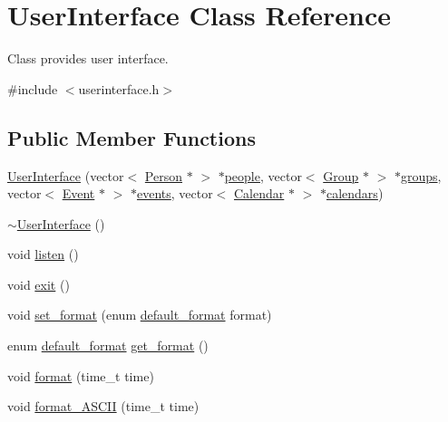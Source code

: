 \hypertarget{classUserInterface}{
\section{UserInterface Class Reference}
\label{df/de1/classUserInterface}
}


Class provides user interface.  




{\ttfamily \#include $<$userinterface.h$>$}

\subsection*{Public Member Functions}
\begin{DoxyCompactItemize}
\item 
\hyperlink{classUserInterface_a72d625f6d41876d679ed067e0f273ed8}{UserInterface} (vector$<$ \hyperlink{classPerson}{Person} $\ast$ $>$ $\ast$\hyperlink{classUserInterface_a3d0914e9d2ba661bc3691397c695287e}{people}, vector$<$ \hyperlink{classGroup}{Group} $\ast$ $>$ $\ast$\hyperlink{classUserInterface_a12676e629660c43c63eb5b01c5c19bc3}{groups}, vector$<$ \hyperlink{classEvent}{Event} $\ast$ $>$ $\ast$\hyperlink{classUserInterface_ae3370dc0d02c19b4b1cc7c47221c2bfa}{events}, vector$<$ \hyperlink{classCalendar}{Calendar} $\ast$ $>$ $\ast$\hyperlink{classUserInterface_abd1f3233d3e666415f6cdf8458b50faa}{calendars})
\item 
\hyperlink{classUserInterface_ae588b2ff1711a016dd4c6fc5002c0841}{$\sim$UserInterface} ()
\item 
void \hyperlink{classUserInterface_ac1cead6c14db26f88802ea035fb59bd9}{listen} ()
\item 
void \hyperlink{classUserInterface_a396eb29856a6afc91bc0e0eef1de2df7}{exit} ()
\item 
void \hyperlink{classUserInterface_a36513fcf018fafc53726cf610f46571f}{set\_\-format} (enum \hyperlink{userinterface_8h_a5a0e707f53d6c5632b2fb5ffd2d22a11}{default\_\-format} format)
\item 
enum \hyperlink{userinterface_8h_a5a0e707f53d6c5632b2fb5ffd2d22a11}{default\_\-format} \hyperlink{classUserInterface_ad543750a7accc0c4825e02a93fda1909}{get\_\-format} ()
\item 
void \hyperlink{classUserInterface_a9373bc1aedbdc68905942bcb7c6a8fd3}{format} (time\_\-t time)
\item 
void \hyperlink{classUserInterface_a41c109a7e042b44dc98a1250681fc684}{format\_\-ASCII} (time\_\-t time)

\end{DoxyCompactItemize}
